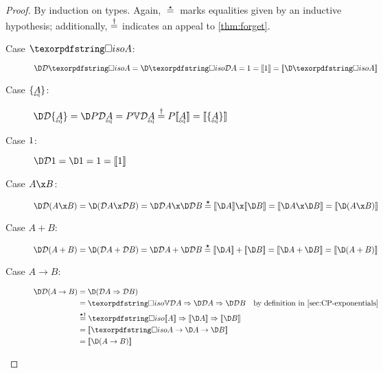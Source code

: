 \documentclass{rntz}\usepackage{fantasy}%
\begin{document}

\thmDeltaDen*
\begin{proof}
  \label{proof:delta-den}
  By induction on types. Again, $\stareq$ marks equalities given by an inductive
  hypothesis; additionally, $\overset{\dagger}{=}$ indicates an appeal to
  \cref{thm:forget}.
  \begin{description}
    \item[Case $\isof A$:] \(\chgs{\incdens{\isof A}}
      = \chgs{\discof{\incdens A}}
      = \termO = \den{1} = \den{\D \isof A}\)


    \item[Case $\tset{\eqt A}$:] \(\chgs{\incdens{\tseteq A}}
      = \chgs{\pfinof{\incdens{\eqt A}}}
      = \pfinof{\vals{\incdens{\eqt A}}}
      \daggereq \pfinof{\den{\eqt A}}
      = \den{\tseteq A}
      \)

    \item[Case $1$:] \(\chgs{\incdens \tunit}
      = \chgs \termO = \termO = \den{\tunit} \)

    \item[Case $A \x B$:] \(\chgs{\incden{A \x B}}
      = \chgs{(\incdens A \x \incdens B)}
      = \chgs{\incdens A} \x \chgs{\incdens B}
      \stareq \den{\D A} \x \den{\D B}
      = \den{\D A \x \D B}
      = \den{\D(A \x B)} \)

    \item[Case $A + B$:] \(\chgs{\incden{A + B}}
      = \chgs{(\incdens A + \incdens B)}
      = \chgs{\incdens A} + \chgs{\incdens B}
      \stareq \den{\D A} + \den{\D B}
      = \den{\D A + \D B}
      = \den{\D(A + B)} \)

    \item[Case $A \to B$:]
      \begin{align*}
        \chgs{\incden{A \to B}}
        &= \chgs{(\expO{\incdens A}{\incdens B})}\\
        &= \expO {\isof{\vals{\incdens A}}} {
          \expO {\chgs{\incdens A}} {\chgs{\incdens B}}}
        & \text{by definition in \cref{sec:CP-exponentials}}
        \\
        &\stardaggereq \expO {\isof {\den A}} {\expO {\den{\D A}} {\den{\D B}}}\\
        &= \den{\isof A \to \D A \to \D B}\\
        &= \den{\D(A \to B)}
      \end{align*}
  \end{description}
\end{proof}
\end{document}
